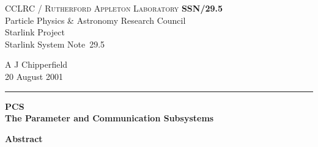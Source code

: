\documentclass[twoside,11pt]{article}
\newcommand{\stardoccategory}  {Starlink System Note}
\newcommand{\stardocinitials}  {SSN}
\newcommand{\stardocnumber}    {29.5}
\newcommand{\stardocauthors}   {A J Chipperfield}
\newcommand{\stardocdate}      {20 August 2001}
\newcommand{\stardoctitle}     {PCS\\[1ex]
                                The Parameter and Communication Subsystems}
\newcommand{\stardocname}{\stardocinitials /\stardocnumber}
\newenvironment{latexonly}{}{}
\renewcommand{\_}{\texttt{\symbol{95}}}
\begin{document}
\thispagestyle{empty}

\begin{latexonly}
   CCLRC / \textsc{Rutherford Appleton Laboratory} \hfill \textbf{\stardocname}\\
   {\large Particle Physics \& Astronomy Research Council}\\
   {\large Starlink Project\\}
   {\large \stardoccategory\ \stardocnumber}
   \begin{flushright}
   \stardocauthors\\
   \stardocdate
   \end{flushright}
   \vspace{-4mm}
   \rule{\textwidth}{0.5mm}
   \vspace{5mm}
   \begin{center}
   {\Large\textbf{\stardoctitle}}
   \end{center}
   \vspace{5mm}

   \vspace{10mm}
   \begin{center}
      {\Large\textbf{Abstract}}
   \end{center}
\end{latexonly}
\end{document}
